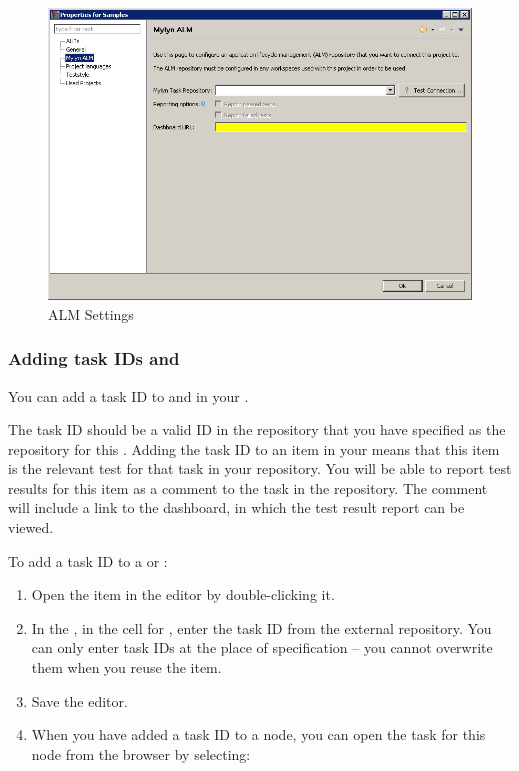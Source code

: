 \begin{figure}[h]
\begin{center}
\includegraphics[width=12.5cm]{Tasks/ALM/PS/almproperties}
\caption{ALM Settings}
\label{TasksALMProjectProperties}
\end{center}
\end{figure}



\subsubsection{Adding task IDs \gdsuites{} and \gdcases{}}
\label{TasksALMAddTask}

You can add a task ID to \gdcases{} and \gdsuites{} in your \gdproject{}. 

The task ID should be a valid ID in the repository that you have specified as the repository for this \gdproject{} . Adding the task ID to an item in your \gdproject{} means that this item is the relevant test for that task in your repository. You will be able to report test results for this item as a comment to the task in the repository. The comment will include a link to the dashboard, in which the test result report can be viewed.

To add a task ID to a \gdcase{} or \gdsuite{}:
\begin{enumerate}
\item Open the item in the editor by double-clicking it.
\item In the \gdpropview{}, in the cell for , enter the task ID from the external repository. You can only enter task IDs at the place of specification -- you cannot overwrite them when you reuse the item.
\item Save the editor. 
\item When you have added a task ID to a node, you can open the task for this node from the browser by selecting:\\
\end{enumerate}

